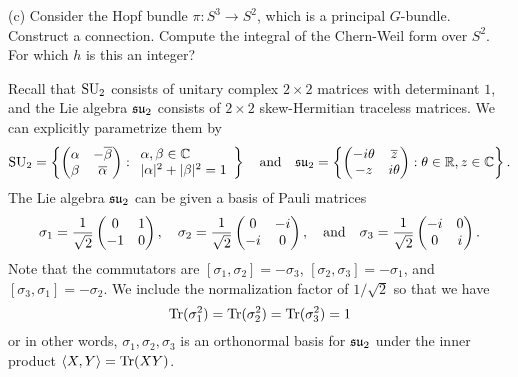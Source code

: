 \documentclass{../../templates/lkx_pset}
\begin{document}
\begin{parts}
	\begin{part}{(c)}
		Consider the Hopf bundle $\pi : S^3 \to S^2$, which is a principal $G$-bundle. Construct a connection. Compute the integral of the Chern-Weil form over $S^2$. For which $h$ is this an integer?
	\end{part}

	Recall that $\operatorname{SU}_2$ consists of unitary complex $2\times 2$ matrices with determinant $1$, and the Lie algebra $\mathfrak{su}_2$ consists of $2\times 2$ skew-Hermitian traceless matrices. We can explicitly parametrize them by
	\[
		\operatorname{SU}_2 = \left\{
		\begin{pmatrix} \alpha & -\overline{\beta}\\ \beta & \overline{\alpha}\end{pmatrix}
		:
		\begin{array}{l}\alpha,\beta\in \mathbb{C}\\|\alpha|^2+|\beta|^2=1\end{array}
		\right\}
		\quad\textrm{and}\quad
		\mathfrak{su}_2 = \left\{
		\begin{pmatrix}
			-i\theta & \overline{z} \\
			-z       & i\theta
		\end{pmatrix}
		:
		\theta\in \mathbb{R}, z\in \mathbb{C}
		\right\}.
	\]
	The Lie algebra $\mathfrak{su}_2$ can be given a basis of Pauli matrices
	\[
		\sigma_1 = \frac{1}{\sqrt{2}}\begin{pmatrix}0 & 1\\ -1 & 0\end{pmatrix},\quad
		\sigma_2 = \frac{1}{\sqrt{2}}\begin{pmatrix}0 & -i\\ -i & 0\end{pmatrix},\quad\textrm{and}\quad
		\sigma_3 = \frac{1}{\sqrt{2}}\begin{pmatrix}-i & 0\\ 0 & i\end{pmatrix}.
	\]
	Note that the commutators are $[\sigma_1, \sigma_2] = -\sigma_3$, $[\sigma_2, \sigma_3]=-\sigma_1$, and $[\sigma_3, \sigma_1]=-\sigma_2$. We include the normalization factor of $1/\sqrt{2}$ so that we have
	\[
    \textrm{Tr}(\sigma_1^2) = \operatorname{Tr}(\sigma_2^2) = \operatorname{Tr}(\sigma_3^2) = 1
	\]
	or in other words, $\sigma_1,\sigma_2,\sigma_3$ is an orthonormal basis for $\mathfrak{su}_2$ under the inner product $\langle X, Y\rangle=\operatorname{Tr}(XY)$.



\end{parts}
\end{document}
